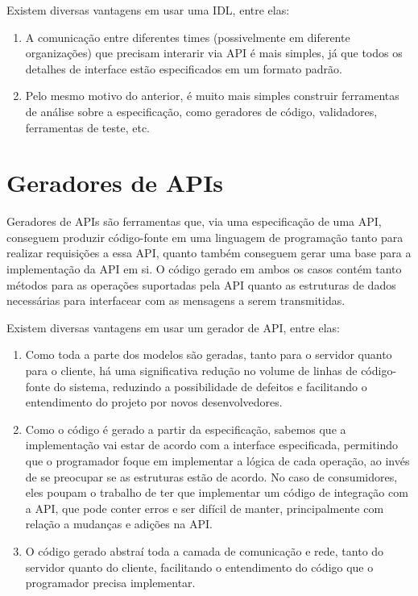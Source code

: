 Existem diversas vantagens em usar uma IDL, entre elas:

\begin{enumerate}
\item
  A comunicação entre diferentes times (possivelmente em diferente organizações) que
  precisam interarir via API é mais simples, já que todos os detalhes de interface
  estão especificados em um formato padrão.
\item
  Pelo mesmo motivo do anterior, é muito mais simples construir ferramentas de análise
  sobre a especificação, como geradores de código, validadores, ferramentas de teste,
  etc.
\end{enumerate}

\section{Geradores de APIs}

Geradores de APIs são ferramentas que, via uma especificação de uma API, conseguem
produzir código-fonte em uma linguagem de programação tanto para realizar requisições
a essa API, quanto também conseguem gerar uma base para a implementação da API em si.
O código gerado em ambos os casos contém tanto métodos para as operações suportadas
pela API quanto as estruturas de dados necessárias para interfacear com as mensagens
a serem transmitidas.

Existem diversas vantagens em usar um gerador de API, entre elas:

\begin{enumerate}
\item
  Como toda a parte dos modelos são geradas, tanto para o servidor quanto para o
  cliente, há uma significativa redução no volume de linhas de código-fonte do sistema,
  reduzindo a possibilidade de defeitos \cite{5010260} e facilitando o entendimento do
  projeto por novos desenvolvedores.
\item
  Como o código é gerado a partir da especificação, sabemos que a implementação
  vai estar de acordo com a interface especificada, permitindo que o programador
  foque em implementar a lógica de cada operação, ao invés de se preocupar se
  as estruturas estão de acordo. No caso de consumidores, eles poupam o trabalho
  de ter que implementar um código de integração com a API, que pode conter erros
  e ser difícil de manter, principalmente com relação a mudanças e adições na API.
\item
  O código gerado abstraí toda a camada de comunicação e rede, tanto do servidor
  quanto do cliente, facilitando o entendimento do código que o programador precisa
  implementar.
\end{enumerate}

